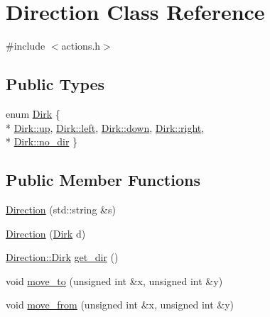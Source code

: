 \hypertarget{class_direction}{\section{Direction Class Reference}
\label{class_direction}
}


{\ttfamily \#include $<$actions.\-h$>$}

\subsection*{Public Types}
\begin{DoxyCompactItemize}
\item 
enum \hyperlink{class_direction_a218282b2789da5abcafb2be32cf99011}{Dirk} \{ \\*
\hyperlink{class_direction_a218282b2789da5abcafb2be32cf99011a46c48bec0d282018b9d167eef7711b2c}{Dirk\-::up}, 
\hyperlink{class_direction_a218282b2789da5abcafb2be32cf99011a811882fecd5c7618d7099ebbd39ea254}{Dirk\-::left}, 
\hyperlink{class_direction_a218282b2789da5abcafb2be32cf99011a74e8333ad11685ff3bdae589c8f6e34d}{Dirk\-::down}, 
\hyperlink{class_direction_a218282b2789da5abcafb2be32cf99011a7c4f29407893c334a6cb7a87bf045c0d}{Dirk\-::right}, 
\\*
\hyperlink{class_direction_a218282b2789da5abcafb2be32cf99011a7a7229b2be097dd8271879ea690eb5bf}{Dirk\-::no\-\_\-dir}
 \}
\end{DoxyCompactItemize}
\subsection*{Public Member Functions}
\begin{DoxyCompactItemize}
\item 
\hyperlink{class_direction_af17924e019c164609181cdf6bca30397}{Direction} (std\-::string \&s)
\item 
\hyperlink{class_direction_a180839d58bb1ff41301425963701d963}{Direction} (\hyperlink{class_direction_a218282b2789da5abcafb2be32cf99011}{Dirk} d)
\item 
\hyperlink{class_direction_a218282b2789da5abcafb2be32cf99011}{Direction\-::\-Dirk} \hyperlink{class_direction_a8160f7e9bd8442e5a5cc66743c223d1d}{get\-\_\-dir} ()
\item 
void \hyperlink{class_direction_a9ccac2a9f99b9c67cac948bfd99cd366}{move\-\_\-to} (unsigned int \&x, unsigned int \&y)
\item 
void \hyperlink{class_direction_a769ec4b4375d0a78596109005a66eb80}{move\-\_\-from} (unsigned int \&x, unsigned int \&y)
\end{DoxyCompactItemize}
